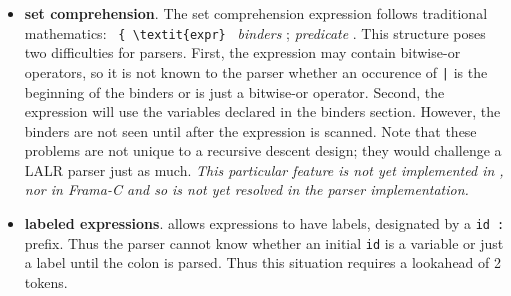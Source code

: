 \begin{itemize}
\item \textbf{set comprehension}. The set comprehension expression follows traditional mathematics: \lstinline| { \textit{expr} | \textit{binders} ; \textit{predicate} . This structure poses two difficulties for parsers. First, the expression may contain bitwise-or operators, so it is not known to the parser whether an occurence of \verb:|: is the beginning of the binders or is just a bitwise-or operator. Second, the expression will use the variables declared in the binders section. However, the binders are not seen until after the expression is scanned. Note that these problems are not unique to a recursive descent design; they would challenge a LALR parser just as much. \textit{This particular feature is not yet implemented in \fclang, nor in Frama-C and so is not yet resolved in the parser implementation.}
\item \textbf{labeled expressions}. \acslpp allows expressions to have labels, designated by a \lstinline|id : | prefix. Thus the parser cannot know whether an initial \lstinline|id| is a variable or just a label until the colon is parsed. Thus this situation requires a lookahead of 2 tokens.

\end{itemize}

